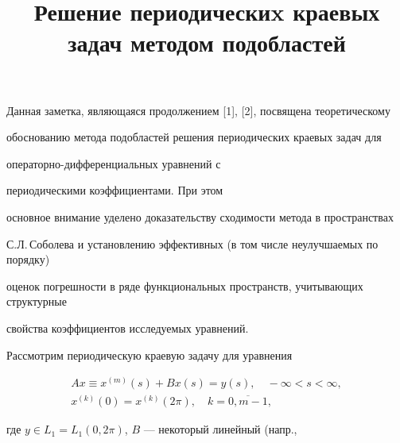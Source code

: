 

\title{Решение периодическиx краевых задач методом подобластей}





\date{}




\pagestyle{plain} %







\maketitle


\label{begin}








Данная заметка, являющаяся продолжением [1], [2], посвящена теоретическому


обоснованию метода подобластей решения периодических краевых задач для


операторно-диф\-фе\-рен\-ци\-аль\-ных уравнений с 


периодическими коэффициентами. При этом


основное внимание уделено доказательству сходимости метода в пространствах


С.Л.\,Соболева и установлению эффективных (в том числе неулучшаемых по порядку)


оценок погрешности в ряде функциональных пространств, учитывающих структурные


свойства коэффициентов исследуемых уравнений.





Рассмотрим периодическую краевую задачу для уравнения


\begin{gather}


Ax \equiv x^{(m)}(s) + Bx(s)=y(s), \quad - \infty < s < \infty,\\


%


x^{(k)}(0)=x^{(k)} (2 \pi), \quad k=\overline{0,m-1},


\end{gather}


где $y \in L_{1}=L_{1}(0,2 \pi)$, $B$ --- некоторый линейный (напр.,


